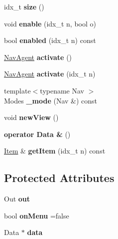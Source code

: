 \begin{DoxyCompactItemize}
\mbox{\label{classNavBase_a8a1b4fb519b387433658f11a46eb1fe9}} 
idx\+\_\+t {\bfseries size} ()
\item 
\mbox{\label{classNavBase_a6be3780547660bc64df57285ced2a60e}} 
void {\bfseries enable} (idx\+\_\+t n, bool o)
\item 
\mbox{\label{classNavBase_af4933e590d105f0332fbc8fec1ae7947}} 
bool {\bfseries enabled} (idx\+\_\+t n) const
\item 
\mbox{\label{classNavBase_afb2043d9a01f2eaf2e63b141ef274ac8}} 
\hyperlink{structNavAgent}{Nav\+Agent} {\bfseries activate} ()
\item 
\mbox{\label{classNavBase_a002c7684845c794af4a658038cac82a8}} 
\hyperlink{structNavAgent}{Nav\+Agent} {\bfseries activate} (idx\+\_\+t n)
\item 
\mbox{\label{classNavBase_a78ee58dfb40948b707b46f08356673b3}} 
{\footnotesize template$<$typename Nav $>$ }\\Modes {\bfseries \+\_\+mode} (Nav \&) const
\item 
\mbox{\label{classNavBase_ac4099dc2d5b669a76e39f34262cb94e4}} 
void {\bfseries new\+View} ()
\item 
\mbox{\label{classNavBase_a001789f9ce2d72323837ee9c239efa86}} 
{\bfseries operator Data \&} ()
\item 
\mbox{\label{classNavBase_a264b9756bd3ec98af54533d764cbbdb0}} 
\hyperlink{structItem}{Item} \& {\bfseries get\+Item} (idx\+\_\+t n) const
\end{DoxyCompactItemize}
\subsection*{Protected Attributes}
\begin{DoxyCompactItemize}
\item 
\mbox{\label{classNavBase_a3a207a77e441e240990f62aa516ed24b}} 
Out {\bfseries out}
\item 
\mbox{\label{classNavBase_ab3dccc3921900db56caa93a4c4324e36}} 
bool {\bfseries on\+Menu} =false
\item 
\mbox{\label{classNavBase_a6964003e5456d613172ed362d6c4a632}} 
Data $\ast$ {\bfseries data}
\end{DoxyCompactItemize}


